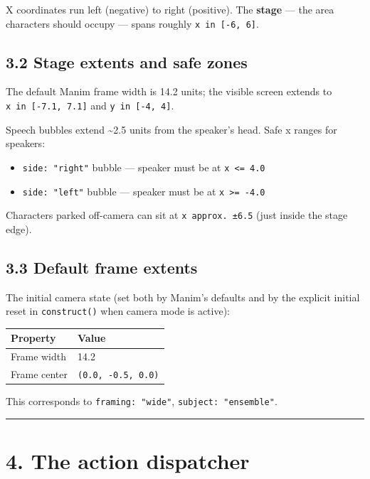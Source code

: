 \documentclass[
  11pt,
]{book}
\providecommand{\tightlist}{%
  \setlength{\itemsep}{0pt}\setlength{\parskip}{0pt}}
\begin{document}
X coordinates run left (negative) to right (positive). The
\textbf{stage} --- the area characters should occupy --- spans roughly
\texttt{x\ in\ {[}-6,\ 6{]}}.

\subsection{3.2 Stage extents and safe
zones}\label{stage-extents-and-safe-zones}

The default Manim frame width is 14.2 units; the visible screen extends
to \texttt{x\ in\ {[}-7.1,\ 7.1{]}} and \texttt{y\ in\ {[}-4,\ 4{]}}.

Speech bubbles extend \textasciitilde2.5 units from the speaker's head.
Safe x ranges for speakers:

\begin{itemize}
\tightlist
\item
  \texttt{side:\ "right"} bubble --- speaker must be at
  \texttt{x\ \textless{}=\ 4.0}
\item
  \texttt{side:\ "left"} bubble --- speaker must be at
  \texttt{x\ \textgreater{}=\ -4.0}
\end{itemize}

Characters parked off-camera can sit at \texttt{x\ approx.\ ±6.5} (just
inside the stage edge).

\subsection{3.3 Default frame extents}\label{default-frame-extents}

The initial camera state (set both by Manim's defaults and by the
explicit initial reset in \texttt{construct()} when camera mode is
active):

\begin{longtable}[]{@{}ll@{}}
\toprule\noalign{}
Property & Value \\
\midrule\noalign{}
\endhead
\bottomrule\noalign{}
\endlastfoot
Frame width & 14.2 \\
Frame center & \texttt{(0.0,\ -0.5,\ 0.0)} \\
\end{longtable}

This corresponds to \texttt{framing:\ "wide"},
\texttt{subject:\ "ensemble"}.

\begin{center}\rule{0.5\linewidth}{0.5pt}\end{center}

\section{4. The action dispatcher}\label{the-action-dispatcher}
\end{document}
